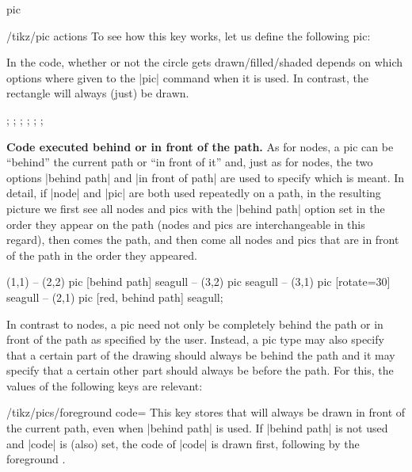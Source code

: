 \begin{pathoperation}{pic}
\begin{key}{/tikz/pic actions}
    To see how this key works, let us define the following pic:
\begin{codeexample}
\end{codeexample}
    In the code, whether or not the circle gets drawn/filled/shaded
    depends on which options where given to the |pic| command when it
    is used. In contrast, the rectangle will always (just) be drawn.
\begin{codeexample}[width=6cm]
\tikz {}; \space
\tikz {}; \space
\tikz {}; \space
\tikz {}; \space
\tikz {}; \space
\tikz {};
\end{codeexample}
  \end{key}
  
  \medskip
  \textbf{Code executed behind or in front of the path.}
  As for nodes, a pic can be ``behind'' the current path or ``in front
  of it'' and, just as for nodes, the two options |behind path| and
  |in front of path| are used to specify which is meant. In detail, if
  |node| and |pic| are both used repeatedly on a path, in the
  resulting picture we first see all nodes and pics with the
  |behind path| option set in the order they appear on the path (nodes
  and pics are interchangeable in this regard), then comes the path,
  and then come all nodes and pics that are in front of the path in
  the order they appeared.
\begin{codeexample}[]
\tikz \fill [fill=blue!20]
     (1,1)
  -- (2,2) pic [behind path]      {seagull}
  -- (3,2) pic                    {seagull}
  -- (3,1) pic [rotate=30]        {seagull}
  -- (2,1) pic [red, behind path] {seagull};
\end{codeexample}
  In contrast to nodes, a pic need not only be completely behind
  the path or in front of the path as specified by the user. Instead,
  a pic type may also specify that a certain part of the drawing
  should always be behind the path and it may specify that a certain
  other part should always be before the path. For this, the values of
  the following keys are relevant:
  
  \begin{key}{/tikz/pics/foreground code=}
    This key stores  that will always be drawn in front of
    the current path, even when |behind path| is used. If
    |behind path| is not used and |code| is (also) set, the code of
    |code| is 
    drawn first, following by the foreground .
  \end{key}
  

\end{pathoperation}
